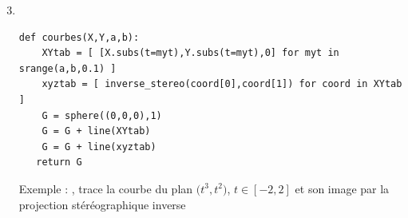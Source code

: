 \begin{frame}[fragile]
\begin{enumerate}
\setcounter{enumi}{2} 
  \item   ~

\begin{algo}
\begin{lstlisting} 
def courbes(X,Y,a,b):
    XYtab = [ [X.subs(t=myt),Y.subs(t=myt),0] for myt in srange(a,b,0.1) ]
    xyztab = [ inverse_stereo(coord[0],coord[1]) for coord in XYtab ]
    G = sphere((0,0,0),1)
    G = G + line(XYtab)    
    G = G + line(xyztab)    
   return G
\end{lstlisting}
\end{algo} 

\pause

 Exemple : , trace la courbe
 du plan $\big(t^3,t^2\big)$, $t\in[-2,2]$ et son image 
 par la projection stéréographique inverse

\end{enumerate}

\end{frame}


